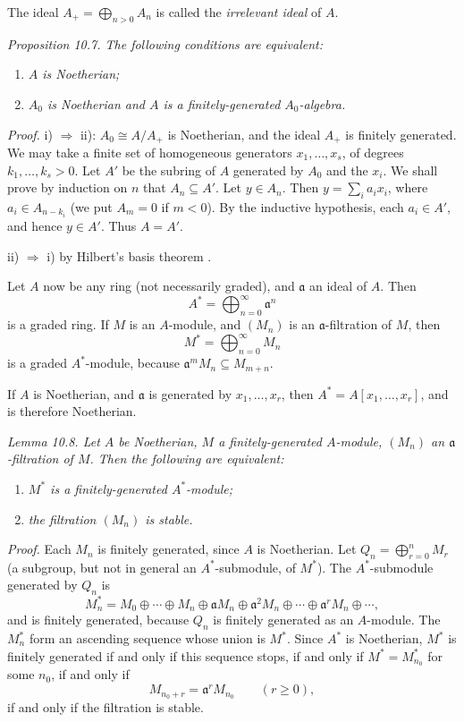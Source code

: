 The ideal $A_+=\bigoplus_{n>0}A_n$ is called the \textit{irrelevant ideal} of $A$.

\noindent\textit{Proposition 10.7. The following conditions are equivalent:}
\begin{enumerate}
\renewcommand{\labelenumi}{\roman{enumi})}
\item \textit{$A$ is Noetherian;}
\item \textit{$A_0$ is Noetherian and $A$ is a finitely-generated $A_0$-algebra.}
\end{enumerate}

\noindent\textit{Proof.} i) $\Rightarrow$ ii): $A_0\cong A/A_+$ is Noetherian, and the ideal $A_+$ is finitely generated. We may take a finite set of homogeneous generators $x_1,\ldots,x_s$, of degrees $k_1,\ldots,k_s>0$. Let $A'$ be the subring of $A$ generated by $A_0$ and the $x_i$. We shall prove by induction on $n$ that $A_n\subseteq A'$. Let $y\in A_n$. Then $y=\sum_i a_ix_i$, where $a_i\in A_{n-k_i}$ (we put $A_m=0$ if $m<0$). By the inductive hypothesis, each $a_i\in A'$, and hence $y\in A'$. Thus $A=A'$.

ii) $\Rightarrow$ i) by Hilbert's basis theorem . \proofbox

Let $A$ now be any ring (not necessarily graded), and $\mathfrak a$ an ideal of $A$. Then
\[
A^*=\bigoplus_{n=0}^{\infty}\mathfrak a^n
\]
is a graded ring. If $M$ is an $A$-module, and $(M_n)$ is an $\mathfrak a$-filtration of $M$, then
\[
M^*=\bigoplus_{n=0}^{\infty}M_n
\]
is a graded $A^*$-module, because $\mathfrak a^mM_n\subseteq M_{m+n}$.

If $A$ is Noetherian, and $\mathfrak a$ is generated by $x_1,\ldots,x_r$, then $A^*=A[x_1,\ldots,x_r]$, and is therefore Noetherian.

\noindent\textit{Lemma 10.8. Let $A$ be Noetherian, $M$ a finitely-generated $A$-module, $(M_n)$ an $\mathfrak a$-filtration of $M$. Then the following are equivalent:}
\begin{enumerate}
\renewcommand{\labelenumi}{\roman{enumi})}
\item \textit{$M^*$ is a finitely-generated $A^*$-module;}
\item \textit{the filtration $(M_n)$ is stable.}
\end{enumerate}

\noindent\textit{Proof.} Each $M_n$ is finitely generated, since $A$ is Noetherian. Let $Q_n=\bigoplus_{r=0}^nM_r$ (a subgroup, but not in general an $A^*$-submodule, of $M^*$). The $A^*$-submodule generated by $Q_n$ is
\[
M_n^*=M_0\oplus\cdots\oplus M_n\oplus\mathfrak aM_n\oplus\mathfrak a^2M_n\oplus\cdots\oplus\mathfrak a^rM_n\oplus\cdots,
\]
and is finitely generated, because $Q_n$ is finitely generated as an $A$-module. The $M_n^*$ form an ascending sequence whose union is $M^*$. Since $A^*$ is Noetherian, $M^*$ is finitely generated if and only if this sequence stops, if and only if $M^*=M_{n_0}^*$ for some $n_0$, if and only if
\[
M_{n_0+r}=\mathfrak a^rM_{n_0}\qquad(r\geq0),
\]
if and only if the filtration is stable. \proofbox

